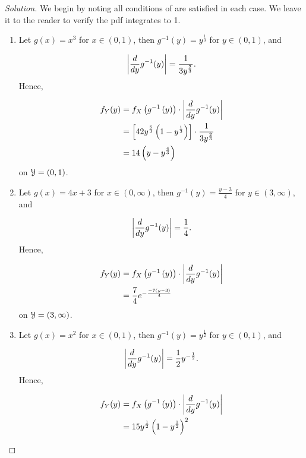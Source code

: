 \documentclass[12pt,letterpaper,reqno]{amsart}
\numberwithin{equation}{subsection}
\begin{document}
\begin{proof}[Solution] We begin by noting all conditions of \cite[Theorem 2.1.5 on page 51]{Berger-Casella} are satisfied in each case. We leave it to the reader to verify the pdf integrates to 1.

\begin{enumerate}[label=(\alph*),leftmargin=*]
    \item Let $g(x) = x^3$ for $x \in (0,1)$, then $g^{-1}(y) = y^{\frac{1}{3}}$ for $y \in (0,1)$, and
    
    \begin{align*}
        \left\lvert{\frac{d{}}{d{y}} g^{-1}(y)}\right\rvert = \frac{1}{3 y^{\frac{2}{3}}}.
    \end{align*}
    Hence,

    \begin{align*}
        {f_Y}\! \left( {y} \right) &= f_X \left( g^{-1} \left( y \right) \right) \cdot \left\lvert{\frac{d{}}{d{y}} g^{-1}(y)}\right\rvert \\
        &=  \left[ 42y^{\frac{5}{3}} \left( 1 -y^{\frac{1}{3}} \right) \right] \cdot \frac{1}{3 y^{\frac{2}{3}}} \\
        &= 14  \left( y - y^{\frac{4}{3}} \right)
    \end{align*}
    on $\mathcal{{Y}} = (0,1)$.
    
    \item Let $g(x) = 4x + 3$ for $x \in (0, \infty)$, then $g^{-1}(y) = \frac{y-3}{4}$ for $y \in (3, \infty)$, and
    
    \begin{align*}
        \left\lvert{\frac{d{}}{d{y}} g^{-1}(y)}\right\rvert = \frac{1}{4}.
    \end{align*}
    Hence,
    
    \begin{align*}
        {f_Y}\! \left( {y} \right) &= f_X \left( g^{-1} \left( y \right) \right) \cdot \left\lvert{\frac{d{}}{d{y}} g^{-1}(y)}\right\rvert \\
        &=  \frac{7}{4} e^{-\frac{-7(y-3)}{4}}
    \end{align*}
    on $\mathcal{{Y}} = (3, \infty)$.
    
    \item Let $g(x) = x^2$ for $x \in (0,1)$, then $g^{-1}(y) = y^{\frac{1}{2}}$ for $y \in (0,1)$, and
    
    \begin{align*}
        \left\lvert{\frac{d{}}{d{y}} g^{-1}(y)}\right\rvert = \frac{1}{2} y^{-\frac{1}{2}}.
    \end{align*}
    Hence,
    
    \begin{align*}
        {f_Y}\! \left( {y} \right) &= f_X \left( g^{-1} \left( y \right) \right) \cdot \left\lvert{\frac{d{}}{d{y}} g^{-1}(y)}\right\rvert \\
        &= 15y^{\frac{1}{2}} \left(1-y^{\frac{1}{2}} \right)^2
    \end{align*}
\end{enumerate}
\end{proof}
\end{document}
